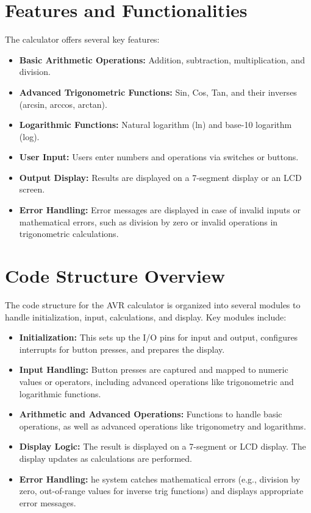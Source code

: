 \documentclass[12pt]{article}
\begin{document}
\section{Features and Functionalities}
The calculator offers several key features:
\begin{itemize}
    \item \textbf{Basic Arithmetic Operations:} Addition, subtraction, multiplication, and division.
    \item \textbf{Advanced Trigonometric Functions:} Sin, Cos, Tan, and their inverses (arcsin, arccos, arctan).
    \item \textbf{Logarithmic Functions:} Natural logarithm (ln) and base-10 logarithm (log).
    \item \textbf{User Input:} Users enter numbers and operations via switches or buttons.
    \item \textbf{Output Display:} Results are displayed on a 7-segment display or an LCD screen.
    \item \textbf{Error Handling:} Error messages are displayed in case of invalid inputs or mathematical errors, such as division by zero or invalid operations in trigonometric calculations.
\end{itemize}

\section{Code Structure Overview}
The code structure for the AVR calculator is organized into several modules to handle initialization, input, calculations, and display. Key modules include:
\begin{itemize}
    \item \textbf{Initialization:} This sets up the I/O pins for input and output, configures interrupts for button presses, and prepares the display.
    \item \textbf{Input Handling:} Button presses are captured and mapped to numeric values or operators, including advanced operations like trigonometric and logarithmic functions.
    \item \textbf{Arithmetic and Advanced Operations:} Functions to handle basic operations, as well as advanced operations like trigonometry and logarithms.
    \item \textbf{Display Logic:} The result is displayed on a 7-segment or LCD display. The display updates as calculations are performed.
    \item \textbf{Error Handling:} he system catches mathematical errors (e.g., division by zero, out-of-range values for inverse trig functions) and displays appropriate error messages.
\end{itemize}
\end{document}
